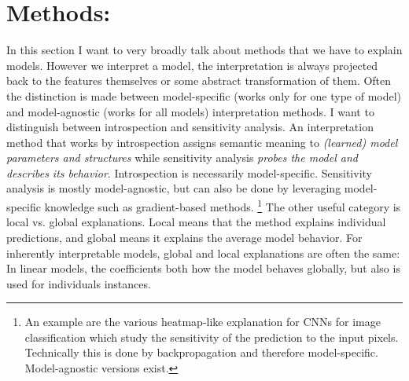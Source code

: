 \documentclass[runningheads]{llncs}
\begin{document}
\section{Methods:}

In this section I want to very broadly talk about methods that we have to explain models.
However we interpret a model, the interpretation is always projected back to the features themselves or some abstract transformation of them.
Often the distinction is made between model-specific (works only for one type of model) and model-agnostic (works for all models) interpretation methods.
I want to distinguish between introspection and sensitivity analysis.
An interpretation method that works by introspection assigns semantic meaning to \textit{(learned) model parameters and structures} while sensitivity analysis \textit{probes the model and describes its behavior}.
Introspection is necessarily model-specific.
Sensitivity analysis is mostly model-agnostic, but can also be done by leveraging model-specific knowledge such as gradient-based methods. \footnote{An example are the various heatmap-like explanation for CNNs for image classification \cite{sundararajan2017axiomatic,lundberg2017unified,montavon2017explaining,simonyan2013deep,shrikumar2016not} which study the sensitivity of the prediction to the input pixels. Technically this is done by backpropagation and therefore model-specific. Model-agnostic versions \cite{ribeiro2016should,lundberg2017unified,zeiler2014visualizing} exist.}
The other useful category is local vs. global explanations.
Local means that the method explains individual predictions, and global means it explains the average model behavior.
For inherently interpretable models, global and local explanations are often the same: In linear models, the coefficients both how the model behaves globally, but also is used for individuals instances.
\end{document}
